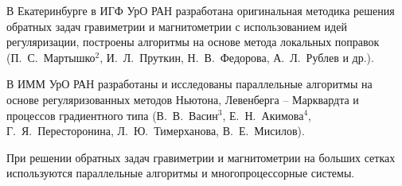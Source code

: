 \documentclass[%
autoref,     %
href,        %
colorlinks,  %
]{disser}
\begin{document}
В Екатеринбурге в ИГФ УрО РАН разработана оригинальная методика решения обратных задач гравиметрии и магнитометрии с использованием идей регуляризации, построены алгоритмы на основе метода локальных поправок (П.~С.~Мартышко$^2$,  И.~Л.~Пруткин, Н.~В.~Федорова, А.~Л.~Рублев и др.).%

В ИММ УрО РАН разработаны и исследованы параллельные алгоритмы на основе регуляризованных методов Ньютона, Левенберга -- Марквардта и процессов градиентного типа (В.~В.~Васин$^3$, Е.~Н.~Акимова$^4$, Г.~Я.~Пересторонина, Л.~Ю.~Тимерханова, В.~Е.~Мисилов).
 
{\tiny	
	\let\thefootnote\relax\let\thefootnote\relax{}
		\let\thefootnote\relax\let\thefootnote\relax{}
		\let\thefootnote\relax\let\thefootnote\relax{}
		\let\thefootnote\relax\let\thefootnote\relax{}
}

При решении обратных задач гравиметрии и магнитометрии на больших сетках используются параллельные алгоритмы и многопроцессорные системы.


\objectivesection
\objectivetext

\methodssection
\methodstext

\noveltysection
\noveltytext

{}


\approbationsection
\approbationtext

\pubsection
\pubtext
\end{document}
